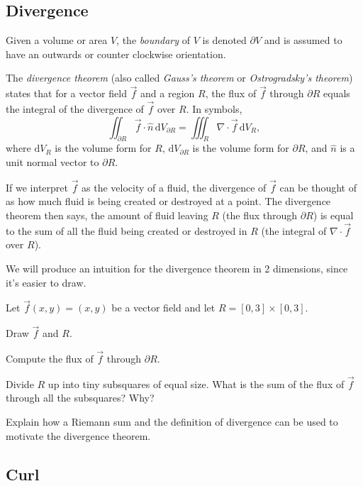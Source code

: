 \documentclass{problemset}
\renewcommand{\d}{\mathrm{d}}
\begin{document}
\subsection*{Divergence}
	\begin{definition}[Boundary]
		Given a volume or area $V$, the \emph{boundary} of $V$
		is denoted $\partial V$ and is assumed to have an outwards or counter clockwise orientation.
	\end{definition}

	\begin{theorem}
		The \emph{divergence theorem} (also called \emph{Gauss's theorem} or \emph{Ostrogradsky's
		theorem}) states that for a vector field $\vec f$ and a region $R$, the flux of $\vec f$
		through $\partial R$ equals the integral of the divergence of $\vec f$ over $R$.
		In symbols,
		\[
			\iint_{\partial R} \vec f\cdot \hat n\,\d V_{\partial R}
			=\iiint_{R} \nabla \cdot \vec f\,\d V_R,
		\]
		where $\d V_R$ is the volume form for $R$, $\d V_{\partial R}$ is the volume form
		for $\partial R$, and $\hat n$ is a unit normal vector to $\partial R$.
	\end{theorem}

	If we interpret $\vec f$ as the velocity
	of a fluid, the divergence of $\vec f$ can be thought of as how much fluid is being created or destroyed at a point.
	The divergence theorem then says, the amount of fluid leaving $R$ (the flux through $\partial R$) is 
	equal to the sum of all the fluid being created or destroyed in $R$ (the integral of $\nabla \cdot \vec f$
	over $R$).

	We will produce an intuition for the divergence theorem in 2 dimensions, since it's easier to draw.
	
	\question
	Let $\vec f(x,y)=(x,y)$ be a vector field and let $R=[0,3]\times [0,3]$.
	\begin{parts}
		\item Draw $\vec f$ and $R$.
		\item Compute the flux of $\vec f$ through $\partial R$.
		\item Divide $R$ up into tiny subsquares of equal size.  What is the sum of
			the flux of $\vec f$ through all the subsquares?  Why?
		\item Explain how a Riemann sum and the definition of divergence can be used
			to motivate the divergence theorem.
	\end{parts}

\subsection*{Curl}
\end{document}

